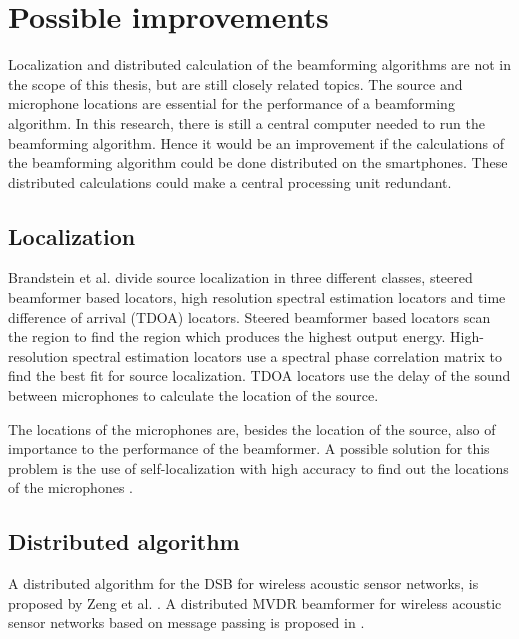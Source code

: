 





\section{Possible improvements}
Localization and distributed calculation of the beamforming algorithms are not in the scope of this thesis, but are still closely related topics. The source and microphone locations are essential for the performance of a beamforming algorithm. In this research, there is still a central computer needed to run the beamforming algorithm. Hence it would be an improvement if the calculations of the beamforming algorithm could be done distributed on the smartphones. These distributed calculations could make a central processing unit redundant.

\subsection{Localization}

Brandstein et al. \cite{brandstein2001} divide source localization in three different classes, steered beamformer based locators, high resolution spectral estimation locators and time difference of arrival (TDOA) locators. Steered beamformer based locators scan the region to find the region which produces the highest output energy. High-resolution spectral estimation locators use a spectral phase correlation matrix to find the best fit for source localization. TDOA locators use the delay of the sound between microphones to calculate the location of the source. 

The locations of the microphones are, besides the location of the source, also of importance to the performance of the beamformer. A possible solution for this problem is the use of self-localization with high accuracy to find out the locations of the microphones \cite{hennecke2011}.

\subsection{Distributed algorithm}

A distributed algorithm for the DSB for wireless acoustic sensor networks, is proposed by Zeng et al. \cite{zeng2013, zeng2014}. A distributed MVDR beamformer for wireless acoustic sensor networks based on message passing is proposed in \cite{heusdens2012}.

